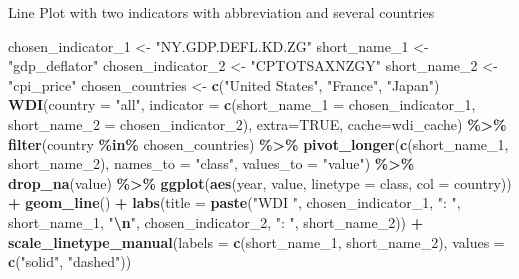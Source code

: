 \documentclass[
  xelatex, ja=standard]{bxjsbook}
\newenvironment{Shaded}{\begin{snugshade}}{\end{snugshade}}
\newcommand{\AttributeTok}[1]{\textcolor[rgb]{0.13,0.29,0.53}{#1}}
\newcommand{\ConstantTok}[1]{\textcolor[rgb]{0.56,0.35,0.01}{#1}}
\newcommand{\FunctionTok}[1]{\textcolor[rgb]{0.13,0.29,0.53}{\textbf{#1}}}
\newcommand{\NormalTok}[1]{#1}
\newcommand{\OtherTok}[1]{\textcolor[rgb]{0.56,0.35,0.01}{#1}}
\newcommand{\SpecialCharTok}[1]{\textcolor[rgb]{0.81,0.36,0.00}{\textbf{#1}}}
\newcommand{\StringTok}[1]{\textcolor[rgb]{0.31,0.60,0.02}{#1}}
\theoremstyle{definition}
\theoremstyle{definition}
\theoremstyle{definition}
\theoremstyle{definition}
\theoremstyle{remark}
\begin{document}
Line Plot with two indicators with abbreviation and several countries

\begin{Shaded}
\begin{Highlighting}[]
\NormalTok{chosen\_indicator\_1 }\OtherTok{\textless{}{-}} \StringTok{"NY.GDP.DEFL.KD.ZG"}
\NormalTok{short\_name\_1 }\OtherTok{\textless{}{-}} \StringTok{"gdp\_deflator"}
\NormalTok{chosen\_indicator\_2 }\OtherTok{\textless{}{-}} \StringTok{"CPTOTSAXNZGY"}
\NormalTok{short\_name\_2 }\OtherTok{\textless{}{-}} \StringTok{"cpi\_price"}
\NormalTok{chosen\_countries }\OtherTok{\textless{}{-}} \FunctionTok{c}\NormalTok{(}\StringTok{"United States"}\NormalTok{, }\StringTok{"France"}\NormalTok{, }\StringTok{"Japan"}\NormalTok{)}
\FunctionTok{WDI}\NormalTok{(}\AttributeTok{country =} \StringTok{"all"}\NormalTok{, }\AttributeTok{indicator =} \FunctionTok{c}\NormalTok{(}\AttributeTok{short\_name\_1 =}\NormalTok{ chosen\_indicator\_1, }\AttributeTok{short\_name\_2 =}\NormalTok{ chosen\_indicator\_2), }\AttributeTok{extra=}\ConstantTok{TRUE}\NormalTok{, }\AttributeTok{cache=}\NormalTok{wdi\_cache) }\SpecialCharTok{\%\textgreater{}\%} 
  \FunctionTok{filter}\NormalTok{(country }\SpecialCharTok{\%in\%}\NormalTok{ chosen\_countries) }\SpecialCharTok{\%\textgreater{}\%} 
  \FunctionTok{pivot\_longer}\NormalTok{(}\FunctionTok{c}\NormalTok{(short\_name\_1, short\_name\_2), }\AttributeTok{names\_to =} \StringTok{"class"}\NormalTok{, }\AttributeTok{values\_to =} \StringTok{"value"}\NormalTok{) }\SpecialCharTok{\%\textgreater{}\%} \FunctionTok{drop\_na}\NormalTok{(value) }\SpecialCharTok{\%\textgreater{}\%}
  \FunctionTok{ggplot}\NormalTok{(}\FunctionTok{aes}\NormalTok{(year, value, }\AttributeTok{linetype =}\NormalTok{ class, }\AttributeTok{col =}\NormalTok{ country)) }\SpecialCharTok{+} \FunctionTok{geom\_line}\NormalTok{() }\SpecialCharTok{+}
  \FunctionTok{labs}\NormalTok{(}\AttributeTok{title =} \FunctionTok{paste}\NormalTok{(}\StringTok{"WDI "}\NormalTok{, chosen\_indicator\_1, }\StringTok{": "}\NormalTok{, short\_name\_1, }\StringTok{"}\SpecialCharTok{\textbackslash{}n}\StringTok{"}\NormalTok{, chosen\_indicator\_2, }\StringTok{": "}\NormalTok{, short\_name\_2)) }\SpecialCharTok{+}
  \FunctionTok{scale\_linetype\_manual}\NormalTok{(}\AttributeTok{labels =} \FunctionTok{c}\NormalTok{(short\_name\_1, short\_name\_2), }\AttributeTok{values =} \FunctionTok{c}\NormalTok{(}\StringTok{"solid"}\NormalTok{, }\StringTok{"dashed"}\NormalTok{))}
\end{Highlighting}
\end{Shaded}
\end{document}
